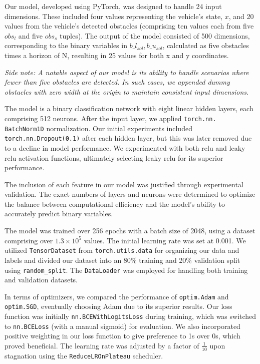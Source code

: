 \documentclass[
	letterpaper, %
	10pt, %
	unnumberedsections, %
	twoside, %
]{LTJournalArticle}
\begin{document}
Our model, developed using PyTorch, was designed to handle 24 input dimensions. These included four values representing the vehicle's state, \(x\), and 20 values from the vehicle's detected obstacles (comprising ten values each from five \(obs_l\) and five \(obs_s\) tuples). The output of the model consisted of 500 dimensions, corresponding to the binary variables in \(b\_l_{sol}, b\_u_{sol}\), calculated as five obstacles times a horizon of N, resulting in 25 values for both x and y coordinates. 

\textit{Side note: A notable aspect of our model is its ability to handle scenarios where fewer than five obstacles are detected. In such cases, we appended dummy obstacles with zero width at the origin to maintain consistent input dimensions.}

The model is a binary classification network with eight linear hidden layers, each comprising 512 neurons. After the input layer, we applied \texttt{torch.nn. BatchNorm1D} normalization. Our initial experiments included \texttt{torch.nn.Dropout(0.1)} after each hidden layer, but this was later removed due to a decline in model performance. We experimented with both relu and leaky relu activation functions, ultimately selecting leaky relu for its superior performance. 

The inclusion of each feature in our model was justified through experimental validation. The exact numbers of layers and neurons were determined to optimize the balance between computational efficiency and the model's ability to accurately predict binary variables.

The model was trained over 256 epochs with a batch size of 2048, using a dataset comprising over \(1.3 \times 10^5\) values. The initial learning rate was set at 0.001. We utilized \texttt{TensorDataset} from \texttt{torch.utils.data} for organizing our data and labels and divided our dataset into an 80\% training and 20\% validation split using \texttt{random\_split}. The \texttt{DataLoader} was employed for handling both training and validation datasets.

In terms of optimizers, we compared the performance of \texttt{optim.Adam} and \texttt{optim.SGD}, eventually choosing Adam due to its superior results. Our loss function was initially \texttt{nn.BCEWithLogitsLoss} during training, which was switched to \texttt{nn.BCELoss} (with a manual sigmoid) for evaluation. We also incorporated positive weighting in our loss function to give preference to 1s over 0s, which proved beneficial. The learning rate was adjusted by a factor of \(\frac{1}{10}\) upon stagnation using the \texttt{ReduceLROnPlateau} scheduler.
\end{document}
